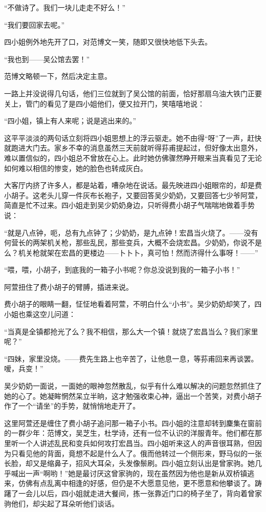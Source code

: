 \par “不做诗了。我们一块儿走走不好么！”
\par “我们要回家去呢。”
\par 四小姐例外地先开了口，对范博文一笑，随即又很快地低下头去。
\par “我也到——吴公馆去罢！”
\par 范博文略顿一下，然后决定主意。
\par 一路上并没说得几句话，他们三位就到了吴公馆的前面，恰好那扇乌油大铁门正要关上，管门的看见了是四小姐他们，便又拉开门，笑嘻嘻地说：
\par “四小姐，镇上有人来呢；说是逃出来的。”
\par 这平平淡淡的两句话立刻将四小姐思想上的浮云驱走。她不由得“呀”了一声，赶快就跑进大门去。家乡不幸的消息虽然三天前就听得荪甫提起过，但好像太出意外，难以置信似的，四小姐总不曾放在心上。此时她仿佛骤然睁开眼来当真看见了无论如何难以相信的惨变，她的脸色也转成灰白。
\par 大客厅内挤了许多人，都是站着，嘈杂地在说话。最先映进四小姐眼帘的，却是费小胡子。这老头儿穿一件灰布长袍子，又要回答吴少奶奶，又要回答七少爷阿萱，简直是忙不过来。四小姐走到吴少奶奶身边，只听得费小胡子气喘喘地做着手势说：
\par “就是八点钟，呃，总有九点钟了；少奶奶，是九点钟！宏昌当火烧了。——没有何营长的两架机关枪，那些乱民，那些变兵，大概不会烧宏昌。少奶奶，你说不是么？机关枪就架在宏昌的更楼边——卜卜卜，真可怕！然而济得什么事呀！——”
\par “喂，喂，小胡子，到底我的一箱子小书呢？你总没说到我的一箱子小书！”
\par 阿萱扭住了费小胡子的臂膊，插进来说。
\par 费小胡子的眼睛一翻，怔怔地看着阿萱，不明白什么“小书”。吴少奶奶却笑了，四小姐也乘这空儿问道：
\par “当真是全镇都抢光了么？我不相信，那么大一个镇！就烧了宏昌当么？我们家里呢？”
\par “四妹，家里没烧。——费先生路上也辛苦了，让他息一息，等荪甫回来再谈罢。嗳，兵变！”
\par 吴少奶奶一面说，一面她的眼神忽然散乱，似乎有什么难以解决的问题忽然抓住了她的心了。她凝眸惘然呆立半晌，这才勉强收束心神，逼出一个苦笑，对费小胡子作了一个“请坐”的手势，就悄悄地走开了。
\par 这里阿萱还是缠住了费小胡子追问那一箱子小书。四小姐的注意却转到麇集在窗前的一群少年：范博文，吴芝生，杜学诗，还有一位不认识的洋服青年。他们都在那里听一个人讲述乱民和变兵如何攻打宏昌当。四小姐听来这人的声音很耳熟，但因为只看见他的背面，竟想不起是什么人了。俄而他转过一个侧形来，野马似的一张长脸，却又是缩鼻子，招风大耳朵，头发像鬃刷。四小姐立刻认出是曾家驹。她几乎喊出一声“啊哟！”她是最讨厌这曾家驹的，现在虽然因为他也是新从双桥镇逃来，仿佛有点乱离中相逢的好感，但仍是不大愿意见他，更不愿意和他攀谈了。踌躇了一会儿以后，四小姐就走进大餐间，拣一张靠近门口的椅子坐了，背向着曾家驹他们，却尖起了耳朵听他们谈话。
